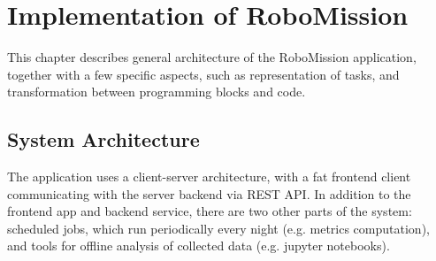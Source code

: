 \chapter{Implementation of RoboMission}
\label{chap:implementation-of-robomission}

This chapter describes general architecture of the RoboMission application,
together with a few specific aspects, such as representation of tasks,
and transformation between programming blocks and code.

\section{System Architecture}

The application uses a client-server architecture,
with a fat frontend client communicating with the server backend via REST API.
In addition to the frontend app and backend service,
there are two other parts of the system:
scheduled jobs, which run periodically every night (e.g. metrics computation),
and tools for offline analysis of collected data
(e.g. jupyter notebooks). %

